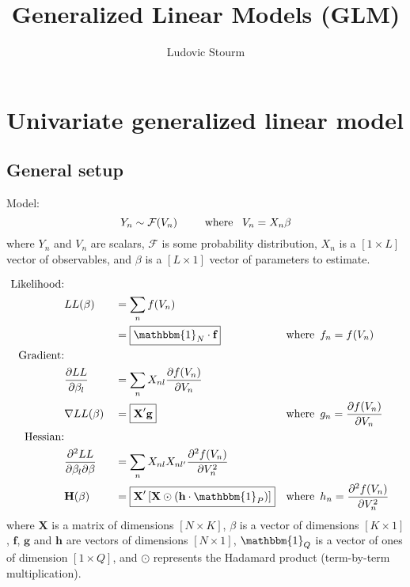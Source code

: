 \documentclass[12pt]{article}
\title{Generalized Linear Models (GLM)}
\author{Ludovic Stourm}
\begin{document}
\maketitle


\section{Univariate generalized linear model}
\subsection{General setup}
Model:
\begin{equation}
	Y_n \sim \mathcal{F}(V_n) \hspace*{25pt} \text{where } \hspace*{5pt} V_n = X_n \beta
\end{equation}
where $Y_n$ and $V_n$ are scalars, $\mathcal{F}$ is some probability distribution, $X_n$ is a $[1 \times L]$ vector of observables, and $\beta$ is a $[L \times 1]$ vector of parameters to estimate.

\begin{equation}
\begin{aligned}
\text{Likelihood:} \\
	& LL(\beta) && = \sum_n f(V_n) \\
	&  && = \boxed{\mathbbm{1}_N \cdot \textbf{f}}  && \text{where} \hspace*{5pt} f_n = f(V_n) \\
\text{Gradient:} \\
	& \frac{\partial LL}{\partial \beta_l} && = \sum_n X_{nl} \frac{\partial f(V_n)}{\partial V_n} \\
	& \nabla LL(\beta) && = \boxed{\textbf{X}' \textbf{g}} && \text{where} \hspace*{5pt} g_n = \frac{\partial f(V_n)}{\partial V_n} \\
\text{Hessian:} \\
	& \frac{\partial^2 LL}{\partial \beta_l \partial \beta_{}} && = \sum_n X_{nl} X_{nl'} \frac{\partial^2 f(V_n)}{\partial V_n^2} \\
	& \textbf{H}(\beta) && = \boxed{\textbf{X}' \left[ \textbf{X} \odot \left(\textbf{h} \cdot \mathbbm{1}_P \right) \right]}  && \text{where} \hspace*{5pt} h_n = \frac{\partial^2 f(V_n)}{\partial V_n^2} \\
\end{aligned}
\end{equation}
where $\textbf{X}$ is a matrix of dimensions $[N \times K]$, $\beta$ is a vector of dimensions $[K \times 1]$, $\textbf{f}$, $\textbf{g}$ and $\textbf{h}$ are vectors of dimensions $[N \times 1]$, $\mathbbm{1}_Q$ is a vector of ones of dimension $[1 \times Q]$, and $\odot$ represents the Hadamard product (term-by-term multiplication).
\end{document}
